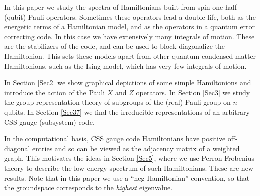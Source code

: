 \documentclass[a4paper,onecolumn,11pt,unpublished]{quantumarticle}
\newcommand{\todo}[1]{\ \textcolor{red}{\{#1\}}\ }
\begin{document}
In this paper we study the spectra of 
Hamiltonians built from spin one-half (qubit) Pauli operators.
Sometimes these operators lead a double life,
both as the energetic terms of a Hamiltonian model, and as
the operators in a quantum error correcting code.
In this case we have
extensively many integrals of motion.
These are the stabilizers of the code,
and can be used to block diagonalize the Hamiltonion.
This sets these models apart from other 
quantum condensed matter Hamiltonions, such as
the Ising model, which has very few integrals of motion.



In Section \ref{Sec2} we show graphical depictions of
some simple Hamiltonions and introduce the action of
the Pauli $X$ and $Z$ operators.
In Section \ref{Sec3} we study the group representation theory
of subgroups of the (real) Pauli group on $n$ qubits.
In Section \ref{Sec37} we find the 
irreducible representations of an arbitrary CSS gauge (subsystem) code.

In the computational basis, 
CSS gauge code Hamiltonians have positive off-diagonal
entries and so can be viewed as the adjacency matrix
of a weighted graph.
This motivates the ideas in Section \ref{Sec5}, where 
we use Perron-Frobenius theory to
describe the low energy spectrum of such Hamiltonians.
These are new results.
Note that in this paper we use a ``neg-Hamiltonian'' convention,
so that the groundspace corresponds to the \emph{highest} eigenvalue.
\end{document}
